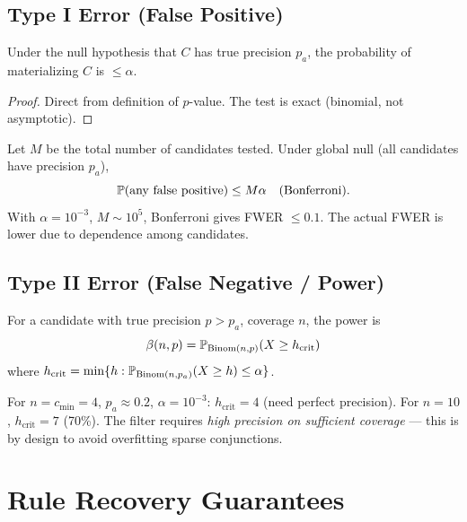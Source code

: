 \subsection{Type I Error (False Positive)}

\begin{theorem}
Under the null hypothesis that $C$ has true precision $p_a$, the probability of materializing $C$ is $\leq \alpha$.
\end{theorem}
\begin{proof}
Direct from definition of $p$-value. The test is exact (binomial, not asymptotic).
\end{proof}

\begin{theorem}
Let $M$ be the total number of candidates tested. Under global null (all candidates have precision $p_a$),
\[
\mathbb{P}(\text{any false positive}) \leq M \alpha \quad \text{(Bonferroni)}.
\]
With $\alpha=10^{-3}$, $M \sim 10^5$, Bonferroni gives FWER $\leq 0.1$. The actual FWER is lower due to dependence among candidates.
\end{theorem}

\subsection{Type II Error (False Negative / Power)}

\begin{theorem}
For a candidate with true precision $p > p_a$, coverage $n$, the power is
\[
\beta(n, p) = \mathbb{P}_{\mathrm{Binom}(n, p)}(X \geq h_{\text{crit}})
\]
where $h_{\text{crit}} = \min\{h : \mathbb{P}_{\mathrm{Binom}(n, p_a)}(X \geq h) \leq \alpha\}$.
\end{theorem}

\begin{corollary}
For $n = c_{\min} = 4$, $p_a \approx 0.2$, $\alpha=10^{-3}$: $h_{\text{crit}} = 4$ (need perfect precision). For $n=10$, $h_{\text{crit}} = 7$ (70\%). The filter requires \emph{high precision on sufficient coverage} — this is by design to avoid overfitting sparse conjunctions.
\end{corollary}

\section{Rule Recovery Guarantees}

